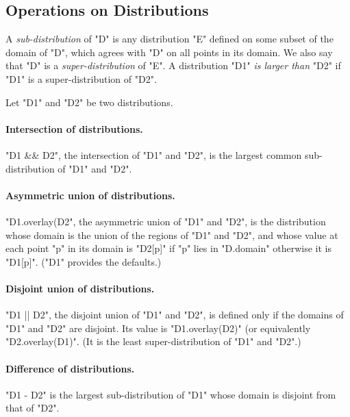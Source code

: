 \subsection{Operations on Distributions}

A {\em sub-distribution} of \xcd"D" is any
distribution \xcd"E" defined on some subset of the domain of \xcd"D",
which agrees with \xcd"D" on all points in its domain. We also say
that \xcd"D" is a {\em super-distribution} of \xcd"E". A distribution
\xcd"D1" {\em is larger than} \xcd"D2" if \xcd"D1" is a
super-distribution of \xcd"D2".

Let \xcd"D1" and \xcd"D2" be two distributions.  


\paragraph{Intersection of distributions.}
\xcd"D1 && D2", the intersection of \xcd"D1" and \xcd"D2", is the
largest common sub-distribution of \xcd"D1" and \xcd"D2".

\paragraph{Asymmetric union of distributions.}
\xcd"D1.overlay(D2", the asymmetric union of \xcd"D1" and \xcd"D2", is the
distribution whose domain is the union of the regions of \xcd"D1" and
\xcd"D2", and whose value at each point \xcd"p" in its domain is \xcd"D2[p]"
if \xcd"p" lies in \xcd"D.domain" otherwise it is \xcd"D1[p]". (\xcd"D1" provides the defaults.)

\paragraph{Disjoint union of distributions.}
\xcd"D1 || D2", the disjoint union of \xcd"D1" and \xcd"D2", is
defined only if the domains of \xcd"D1" and \xcd"D2" are disjoint. Its
value is \xcd"D1.overlay(D2)" (or equivalently \xcd"D2.overlay(D1)".
(It is the least super-distribution of \xcd"D1" and \xcd"D2".)

\paragraph{Difference of distributions.}
\xcd"D1 - D2" is the largest sub-distribution of \xcd"D1" whose domain is
disjoint from that of \xcd"D2".


